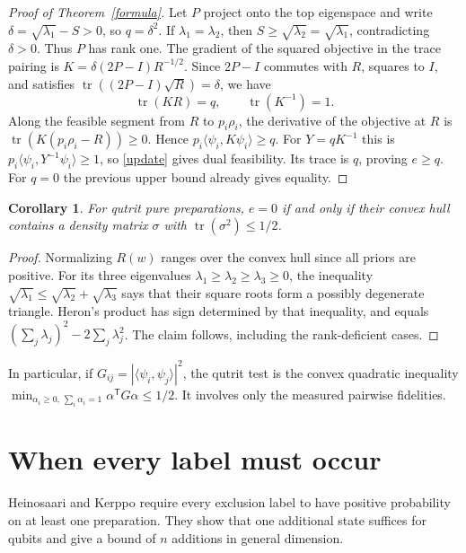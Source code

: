 \documentclass[11pt,a4paper]{article}
\newtheorem{corollary}[theorem]{Corollary}
\theoremstyle{remark}
\newcommand{\tr}{\operatorname{tr}}
\begin{document}
\begin{proof}[Proof of Theorem~\ref{formula}]
Let \(P\) project onto the top eigenspace and write \(\delta=\sqrt{\lambda_1}-S>0\), so \(q=\delta^2\). If \(\lambda_1=\lambda_2\), then \(S\ge\sqrt{\lambda_2}=\sqrt{\lambda_1}\), contradicting \(\delta>0\). Thus \(P\) has rank one. The gradient of the squared objective in the trace pairing is \(K=\delta(2P-I)R^{-1/2}\). Since \(2P-I\) commutes with \(R\), squares to \(I\), and satisfies \(\tr((2P-I)\sqrt R)=\delta\), we have
\[
          \tr(KR)=q,\qquad \tr(K^{-1})=1.
\]
Along the feasible segment from \(R\) to \(p_i\rho_i\), the derivative of the objective at \(R\) is \(\tr(K(p_i\rho_i-R))\ge0\). Hence \(p_i\langle\psi_i,K\psi_i\rangle\ge q\). For \(Y=qK^{-1}\) this is \(p_i\langle\psi_i,Y^{-1}\psi_i\rangle\ge1\), so \eqref{update} gives dual feasibility. Its trace is \(q\), proving \(e\ge q\). For \(q=0\) the previous upper bound already gives equality.
\end{proof}

\begin{corollary}
For qutrit pure preparations, \(e=0\) if and only if their convex hull contains a density matrix \(\sigma\) with \(\tr(\sigma^2)\le1/2\).
\end{corollary}
\begin{proof}
Normalizing \(R(w)\) ranges over the convex hull since all priors are positive. For its three eigenvalues \(\lambda_1\ge\lambda_2\ge\lambda_3\ge0\), the inequality \(\sqrt{\lambda_1}\le\sqrt{\lambda_2}+\sqrt{\lambda_3}\) says that their square roots form a possibly degenerate triangle. Heron's product has sign determined by that inequality, and equals \((\sum_j\lambda_j)^2-2\sum_j\lambda_j^2\). The claim follows, including the rank-deficient cases.
\end{proof}

In particular, if \(G_{ij}=|\langle\psi_i,\psi_j\rangle|^2\), the qutrit test is the convex quadratic inequality \(\min_{\alpha_i\ge0,\,\sum_i\alpha_i=1}\alpha^{\mathsf T}G\alpha\le1/2\). It involves only the measured pairwise fidelities.

\section{When every label must occur}

Heinosaari and Kerppo \cite{HK} require every exclusion label to have positive probability on at least one preparation. They show that one additional state suffices for qubits and give a bound of \(n\) additions in general dimension.
\end{document}
